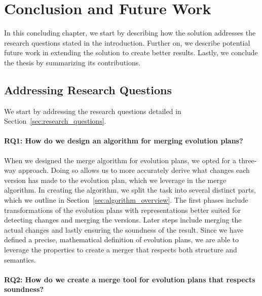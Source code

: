 \documentclass[a4paper,english]{ifimaster}
\begin{document}
\chapter{Conclusion and Future Work}%
\label{cha:conclusion_and_future_work}

In this concluding chapter, we start by describing how the solution addresses the research questions stated in the introduction. Further on, we describe potential future work in extending the solution to create better results. Lastly, we conclude the thesis by summarizing its contributions.

\section{Addressing Research Questions}%
\label{sec:addressing_research_questions}

We start by addressing the research questions detailed in Section~\vref{sec:research_questions}.

\subsubsection{RQ1: How do we design an algorithm for merging evolution plans?} 

When we designed the merge algorithm for evolution plans, we opted for a three-way approach. Doing so allows us to more accurately derive what changes each version has made to the evolution plan, which we leverage in the merge algorithm. In creating the algorithm, we split the task into several distinct parts, which we outline in Section~\vref{sec:algorithm_overview}. The first phases include transformations of the evolution plans with representations better suited for detecting changes and merging the versions. Later steps include merging the actual changes and lastly ensuring the soundness of the result. Since we have defined a precise, mathematical definition of evolution plans, we are able to leverage the properties to create a merger that respects both structure and semantics.

\subsubsection{RQ2: How do we create a merge tool for evolution plans that respects soundness?}
\end{document}
